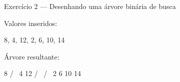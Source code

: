 Exercício 2 — Desenhando uma árvore binária de busca

Valores inseridos:

8, 4, 12, 2, 6, 10, 14

Árvore resultante:

        8
      /   \
     4     12
    / \   /  \
   2   6 10  14